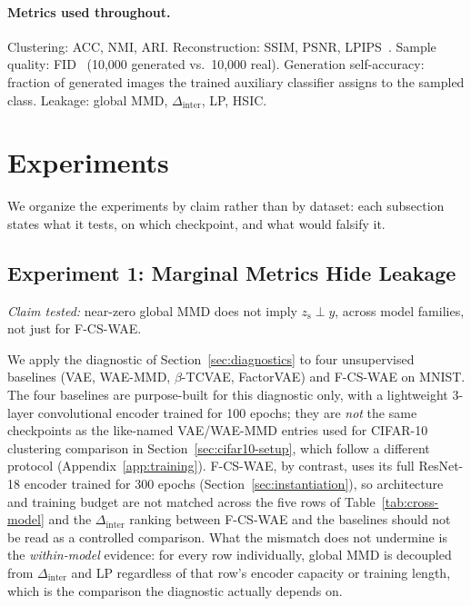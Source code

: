 \documentclass[10pt,letterpaper]{article}
\newcommand{\ours}{F-CS-WAE}
\newcommand{\zs}{z_{\mathrm{s}}}
\begin{document}
\paragraph{Metrics used throughout.} Clustering: ACC, NMI, ARI.
Reconstruction: SSIM, PSNR, LPIPS~\citep{zhang2018unreasonable}. Sample
quality: FID~\citep{heusel2017gans} (10,000 generated vs.\ 10,000 real).
Generation self-accuracy: fraction of generated images the trained
auxiliary classifier assigns to the sampled class. Leakage: global MMD,
$\Delta_{\mathrm{inter}}$, LP, HSIC.

\section{Experiments}
\label{sec:experiments}

We organize the experiments by claim rather than by dataset: each
subsection states what it tests, on which checkpoint, and what would
falsify it.

\subsection{Experiment 1: Marginal Metrics Hide Leakage}
\label{sec:cross-model}
\label{sec:cross-model-baseline}

\emph{Claim tested:} near-zero global MMD does not imply
$\zs\perp y$, across model families, not just for \ours{}.

We apply the diagnostic of Section~\ref{sec:diagnostics} to four
unsupervised baselines (VAE, WAE-MMD, $\beta$-TCVAE, FactorVAE) and \ours{}
on MNIST. The four baselines are purpose-built for this diagnostic only,
with a lightweight 3-layer convolutional encoder trained for 100 epochs;
they are \emph{not} the same checkpoints as the like-named VAE/WAE-MMD
entries used for CIFAR-10 clustering comparison in
Section~\ref{sec:cifar10-setup}, which follow a different protocol
(Appendix~\ref{app:training}). \ours{}, by contrast, uses its full
ResNet-18 encoder trained for 300 epochs (Section~\ref{sec:instantiation}),
so architecture and training budget are not matched across the five rows of
Table~\ref{tab:cross-model} and the $\Delta_{\mathrm{inter}}$ ranking
between \ours{} and the baselines should not be read as a controlled
comparison. What the mismatch does not undermine is the \emph{within-model}
evidence: for every row individually, global MMD is decoupled from
$\Delta_{\mathrm{inter}}$ and LP regardless of that row's encoder capacity
or training length, which is the comparison the diagnostic actually depends
on.
\end{document}

